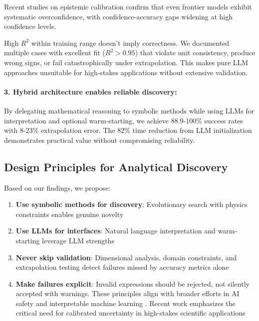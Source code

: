 \documentclass[twoside,11pt]{article}
\begin{document}
Recent studies on epistemic calibration \citep{chen2025epistemic} confirm that even frontier models exhibit systematic overconfidence, with confidence-accuracy gaps widening at high confidence levels.

High $R^2$ within training range doesn't imply correctness. We documented multiple cases with excellent fit ($R^2 > 0.95$) that violate unit consistency, produce wrong signs, or fail catastrophically under extrapolation. This makes pure LLM approaches unsuitable for high-stakes applications without extensive validation.

\paragraph{3. Hybrid architecture enables reliable discovery:}

By delegating mathematical reasoning to symbolic methods while using LLMs for interpretation and optional warm-starting, we achieve 88.9-100\% success rates with 8-23\% extrapolation error. The 82\% time reduction from LLM initialization demonstrates practical value without compromising reliability.

\subsection{Design Principles for Analytical Discovery}

Based on our findings, we propose:

\begin{enumerate}
\item \textbf{Use symbolic methods for discovery}: Evolutionary search with physics constraints enables genuine novelty
\item \textbf{Use LLMs for interfaces}: Natural language interpretation and warm-starting leverage LLM strengths
\item \textbf{Never skip validation}: Dimensional analysis, domain constraints, and extrapolation testing detect failures missed by accuracy metrics alone
\item \textbf{Make failures explicit}: Invalid expressions should be rejected, not silently accepted with warnings. These principles align with broader efforts in AI safety \citep{russell2019human,amodei2016concrete} and interpretable machine learning \citep{lipton2018mythos}. Recent work emphasizes the critical need for calibrated uncertainty \citep{chen2025epistemic} in high-stakes scientific applications
\end{enumerate}
\end{document}
